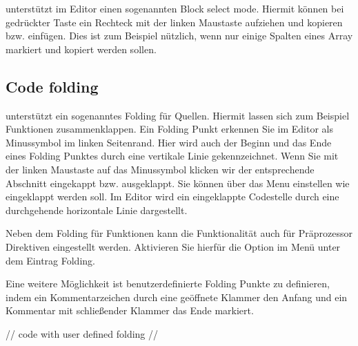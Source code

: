 \codeblocks unterstützt im Editor einen sogenannten Block select mode. Hiermit können bei gedrückter  Taste ein Rechteck mit der linken Maustaste aufziehen und kopieren bzw. einfügen. Dies ist zum Beispiel nützlich, wenn nur einige Spalten eines Array markiert und kopiert werden sollen.


\subsection{Code folding}

\codeblocks unterstützt ein sogenanntes Folding für Quellen. Hiermit lassen sich zum Beispiel Funktionen zusammenklappen. Ein Folding Punkt erkennen Sie im Editor als Minussymbol im linken Seitenrand. Hier wird auch der Beginn und das Ende eines Folding Punktes durch eine vertikale Linie gekennzeichnet. Wenn Sie mit der linken Maustaste auf das Minussymbol klicken wir der entsprechende Abschnitt eingekappt bzw. ausgeklappt. Sie können über das Menu  einstellen wie eingeklappt werden soll. Im Editor wird ein eingeklappte Codestelle durch eine durchgehende horizontale Linie dargestellt.


Neben dem Folding für Funktionen kann die Funktionalität auch für Präprozessor Direktiven eingestellt werden. Aktivieren Sie hierfür die Option  im Menü  unter dem Eintrag Folding.

Eine weitere Möglichkeit ist benutzerdefinierte Folding Punkte zu definieren, indem ein Kommentarzeichen durch eine geöffnete Klammer den Anfang und ein Kommentar mit schließender Klammer das Ende markiert.

\begin{code}
//{
code with user defined folding
//}
\end{code}


